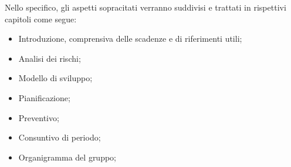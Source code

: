 Nello specifico, gli aspetti sopracitati verranno suddivisi e trattati in rispettivi capitoli come segue:
    \begin{itemize}
        \item Introduzione, comprensiva delle scadenze e di riferimenti utili;
        \item Analisi dei rischi;
        \item Modello di sviluppo;
        \item Pianificazione;
        \item Preventivo;
        \item Consuntivo di periodo;
        \item Organigramma del gruppo;
    \end{itemize}